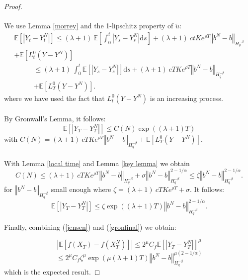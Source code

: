 \documentclass[12pt]{article}
\newcommand{\norme}[1]{\left\Vert #1\right\Vert}
\newcommand{\E}{\mathbb{E}}
\newcommand{\di}{\mathrm{d}}
\begin{document}
\begin{proof}
    \paragraph{}
    We use Lemma \ref{morrey} and the 1-lipschitz property of $\tilde{u}$:
    \begin{multline*}
    \E\left[\left|Y_t-Y_t^N\right|\right]\leq (\lambda + 1)\ \E\left[\int_0^t\left|Y_s-Y_s^N\right| \di s\right] +(\lambda + 1)\ ctKe^{\rho T}\norme{b^N-b}_{H^{-\beta}_{q}}\\ + \E \left[L_t^0(Y-Y^N)\right]
    \end{multline*}    
    \begin{multline*}
    \leq (\lambda + 1)\ \int_0^t\E\left[\left|Y_s-Y_s^N\right|\right] \di s + (\lambda + 1)\ cTKe^{\rho T}\norme{b^N-b}_{H^{-\beta}_{q}}\\ + \E \left[L_T^0(Y-Y^N)\right].
    \end{multline*}
    where we have used the fact that $L_t^0(Y-Y^N)$ is an increasing process.    
    \paragraph{}
    By Gronwall's Lemma, it follows:
    \begin{equation}\label{gronwall}
    \E\left[\left|Y_T-Y_T^N\right|\right] \leq C(N) \exp((\lambda+1)T)
    \end{equation}
    with $C(N) = (\lambda + 1)\ cTKe^{\rho T}\norme{b^N-b}_{H^{-\beta}_{q}} + \E \left[L_T^0(Y-Y^N)\right].$      
    
    \paragraph{}
    With Lemma \ref{local time} and Lemma \ref{key lemma} we obtain \begin{equation*}
    C(N) \leq (\lambda + 1)\ cTKe^{\rho T}\norme{b^N-b}_{H^{-\beta}_{q}} + \sigma\norme{b^N-b}_{H^{-\beta}_{q}}^{2-1/\alpha} \leq \zeta \norme{b^N-b}_{H^{-\beta}_{q}}^{2-1/\alpha}.
    \end{equation*}   
    for $\norme{b^N-b}_{H^{-\beta}_{q}}$ small enough where $\zeta = (\lambda + 1)\ cTKe^{\rho T} + \sigma $. It follows:
    \begin{equation}\label{gronfinal}
    \E\left[\left|Y_T-Y_T^N\right|\right] \leq \zeta \exp((\lambda+1)T) \norme{b^N-b}_{H^{-\beta}_{q}}^{2-1/\alpha}.
    \end{equation}
    
    Finally, combining (\ref{jensen}) and (\ref{gronfinal}) we obtain:
    
    \begin{equation*}
    \left|\E\left[f\left(X_T\right)-f\left(X_T^N\right)\right]\right| \leq 2^\mu C_f  \E\left[\left|Y_T-Y_T^N\right|\right]^\mu
    \end{equation*}
    \begin{equation*}
    \leq 2^\mu C_f  \zeta^\mu \exp(\mu(\lambda+1)T) \norme{b^N-b}_{H^{-\beta}_{q}}^{\mu(2-1/\alpha)}
    \end{equation*}    
    which is the expected result.
    
\end{proof}   
\end{document}
